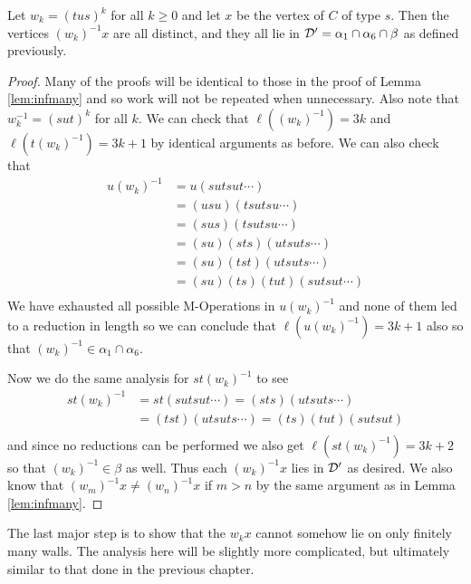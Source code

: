 \documentclass[class=book, crop=false]{standalone}
\begin{document}
\begin{lemma}
	\label{lem:336f2inf}
	Let $w_k=(tus)^k$ for all $k\ge 0$ and let $x$ be the vertex of $C$ of type $s.$ Then the vertices $(w_k)^{-1}x$ are all distinct, and they all lie in $\mathcal{D}'=\alpha_1\cap \alpha_6\cap\beta$ as defined previously.
\end{lemma}
\begin{proof}
	Many of the proofs will be identical to those in the proof of Lemma \ref{lem:infmany} and so work will not be repeated when unnecessary. Also note that $w_k^{-1}=(sut)^k$ for all $k.$ We can check that $\ell((w_k)^{-1})=3k$ and $\ell(t(w_k)^{-1})=3k+1$ by identical arguments as before. We can also check that
	\begin{align*}
		u(w_k)^{-1}&=u(sutsut\cdots)\\
		    &=(usu)(tsutsu\cdots)\\
		    &=(sus)(tsutsu\cdots)\\
		    &=(su)(sts)(utsuts\cdots)\\
		    &=(su)(tst)(utsuts\cdots)\\
		    &=(su)(ts)(tut)(sutsut\cdots)\\
	\end{align*}
	We have exhausted all possible M-Operations in $u(w_k)^{-1}$ and none of them led to a reduction in length so we can conclude that $\ell(u(w_k)^{-1})=3k+1$ also so that $(w_k)^{-1}\in \alpha_1\cap \alpha_6.$

	Now we do the same analysis for $st(w_k)^{-1}$ to see
\begin{align*}
	st(w_k)^{-1}&=st(sutsut\cdots)=(sts)(utsuts\cdots)\\
	     &=(tst)(utsuts\cdots)=(ts)(tut)(sutsut)\\
\end{align*}
and since no reductions can be performed we also get $\ell(st(w_k)^{-1})=3k+2$ so that $(w_k)^{-1}\in \beta$ as well. Thus each $(w_k)^{-1}x$ lies in $\mathcal{D}'$ as desired. We also know that $(w_m)^{-1}x\neq (w_n)^{-1}x$ if $m>n$ by the same argument as in Lemma \ref{lem:infmany}.
\end{proof}

The last major step is to show that the $w_kx$ cannot somehow lie on only finitely many walls. The analysis here will be slightly more complicated, but ultimately similar to that done in the previous chapter.
\end{document}
